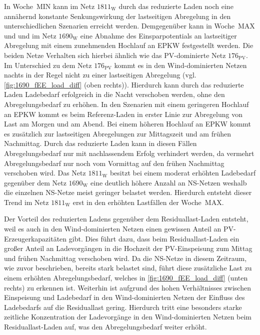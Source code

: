 In Woche~MIN kann im Netz \(1811_{\text{W}}\) durch das reduzierte Laden noch eine annähernd konstante Senkungswirkung der lastseitigen Abregelung in den unterschiedlichen Szenarien erreicht werden.
Demgegenüber kann in Woche~MAX und und im Netz \(1690_{\text{W}}\) eine Abnahme des Einsparpotentials an lastseitiger Abregelung mit einem zunehmenden Hochlauf an \gls{EPKW} festgestellt werden.
Die beiden Netze Verhalten sich hierbei ähnlich wie das \gls{PV}-dominierte Netz \(176_{\text{PV}}\).
Im Unterschied zu dem Netz \(176_{\text{PV}}\) kommt es in den Wind-dominierten Netzen nachts in der Regel nicht zu einer lastseitigen Abregelung (vgl. \autoref{fig:1690_fEE_load_diff} (oben rechts)).
Hierdurch kann durch das reduzierte Laden Ladebedarf erfolgreich in die Nacht verschoben werden, ohne den Abregelungsbedarf zu erhöhen.
In den Szenarien mit einem geringeren Hochlauf an \gls{EPKW} kommt es beim Referenz-Laden in erster Linie zur Abregelung von Last am Morgen und am Abend.
Bei einem höheren Hochlauf an \gls{EPKW} kommt es zusätzlich zur lastseitigen Abregelungen zur Mittagszeit und am frühen Nachmittag.
Durch das reduzierte Laden kann in diesen Fällen Abregelungsbedarf nur mit nachlassendem Erfolg verhindert werden, da vermehrt Abregelungsbedarf nur noch vom Vormittag auf den frühen Nachmittag verschoben wird.
Das Netz \(1811_{\text{W}}\) besitzt bei einem moderat erhöhten Ladebedarf gegenüber dem Netz \(1690_{\text{W}}\) eine deutlich höhere Anzahl an \gls{NS}-Netzen weshalb die einzelnen \gls{NS}-Netze meist geringer belastet werden.
Hierdurch entsteht dieser Trend im Netz \(1811_{\text{W}}\) erst in den erhöhten Lastfällen der Woche~MAX.



Der Vorteil des reduzierten Ladens gegenüber dem Residuallast-Laden entsteht, weil es auch in den Wind-dominierten Netzen einen gewissen Anteil an \gls{PV}-Erzeugerkapazitäten gibt.
Dies führt dazu, dass beim Residuallast-Laden ein großer Anteil an Ladevorgängen in die Hochzeit der \gls{PV}-Einspeisung zum Mittag und frühen Nachmittag verschoben wird.
Da die \gls{NS}-Netze in diesem Zeitraum, wie zuvor beschrieben, bereits stark belastet sind, führt diese zusätzliche Last zu einem erhöhten Abregelungsbedarf, welches in \autoref{fig:1690_fEE_load_diff} (unten rechts) zu erkennen ist.
Weiterhin ist aufgrund des hohen Verhältnisses zwischen Einspeisung und Ladebedarf in den Wind-dominierten Netzen der Einfluss des Ladebedarfs auf die Residuallast gering.
Hierdurch tritt eine besonders starke zeitliche Konzentration der Ladevorgänge in den Wind-dominierten Netzen beim Residuallast-Laden auf, was den Abregelungsbedarf weiter erhöht.

